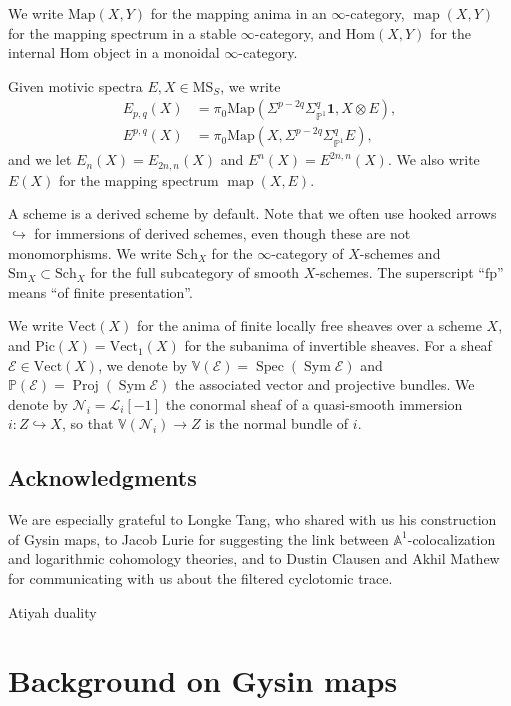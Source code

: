\documentclass{amsart}
\makeatletter
\def\new@part{\@startsection{part}{0}%
  \z@{\linespacing\@plus\linespacing}{.5\linespacing}%
  {\normalfont\large\bfseries\raggedright}}
\def\part#1{%
{\def\@secnumfont{\bfseries}%
\new@part{#1}%
}}
\numberwithin{equation}{section}
\theoremstyle{plain}
\theoremstyle{definition}
\let\scr=\mathcal
\let\bb=\mathbb
\def\A{\bb A}
\def\P{\bb P}
\def\V{\bb V}
\def\1{\mathbf 1}
\let\into=\hookrightarrow
\DeclareMathOperator{\Sym}{Sym}
\def\Hom{\mathrm{Hom}}
\def\Map{\mathrm{Map}}
\DeclareMathOperator{\Spec}{Spec}
\DeclareMathOperator{\Proj}{Proj}
\def\Pic{\mathrm{Pic}}
\let\cat=\mathrm
\def\Sch{\cat{S}\mathrm{ch}{}}
\def\Sm{{\cat{S}\mathrm{m}}}
\def\Vect{\cat{V}\mathrm{ect}{}}
\def\MS{\mathrm{MS}}
\def\fp{\mathrm{fp}}
\newcommand{\SigmaP}{\Sigma_{\mathbb{P}^1}}
\newcommand{\map}{\operatorname{map}}
\makeatother
\begin{document}
We write $\Map(X,Y)$ for the mapping anima in an $\infty$-category, $\map(X,Y)$ for the mapping spectrum in a stable $\infty$-category, and $\Hom(X,Y)$ for the internal Hom object in a monoidal $\infty$-category.

Given motivic spectra $E,X\in \MS_S$, we write 
\begin{align*}
	E_{p,q}(X)&=\pi_0\Map(\Sigma^{p-2q}\SigmaP^q\1, X\otimes E),\\
	E^{p,q}(X)&=\pi_0\Map(X, \Sigma^{p-2q}\SigmaP^qE),
\end{align*}
and we let $E_n(X)=E_{2n,n}(X)$ and $E^n(X)=E^{2n,n}(X)$. We also write $E(X)$ for the mapping spectrum $\map(X,E)$.

A scheme is a derived scheme by default. Note that we often use hooked arrows $\into$ for immersions of derived schemes, even though these are not monomorphisms.
We write $\Sch_X$ for the $\infty$-category of $X$-schemes and $\Sm_X\subset \Sch_X$ for the full subcategory of smooth $X$-schemes. The superscript ``$\fp$'' means ``of finite presentation''.

We write $\Vect(X)$ for the anima of finite locally free sheaves over a scheme $X$, and $\Pic(X)=\Vect_1(X)$ for the subanima of invertible sheaves.
For a sheaf $\scr E\in\Vect(X)$, we denote by $\V(\scr E)=\Spec(\Sym\scr E)$ and $\P(\scr E)=\Proj(\Sym\scr E)$ the associated vector and projective bundles.
We denote by $\scr N_i=\scr L_i[-1]$ the conormal sheaf of a quasi-smooth immersion $i\colon Z\into X$, so that $\V(\scr N_i)\to Z$ is the normal bundle of $i$.

\subsection*{Acknowledgments}
We are especially grateful to Longke Tang, who shared with us his construction of Gysin maps, to Jacob Lurie for suggesting the link between $\A^1$-colocalization and logarithmic cohomology theories, and to Dustin Clausen and Akhil Mathew for communicating with us about the filtered cyclotomic trace.

\part{Atiyah duality}

\section{Background on Gysin maps}
\label{sec:gysin}
\end{document}
